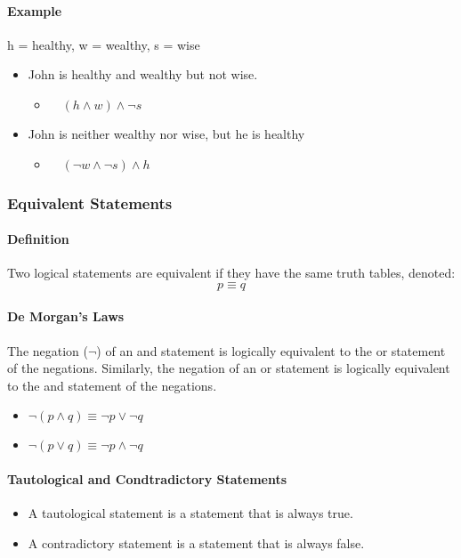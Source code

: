 \paragraph*{Example}
h = healthy, w = wealthy, s = wise\\
\begin{itemize}
    \item John is healthy and wealthy but not wise. 
    \begin{itemize}
        \item $\quad (h \land w) \land \neg s$
    \end{itemize}
    \item John is neither wealthy nor wise, but he is healthy
    \begin{itemize}
        \item $\quad (\neg w \land \neg s) \land h$
    \end{itemize} 
\end{itemize}

\subsubsection*{Equivalent Statements}
\paragraph*{Definition}
Two logical statements are equivalent if they have the same truth tables, denoted:
\begin{equation*}
    p \equiv q
\end{equation*}

\paragraph*{De Morgan's Laws}
The negation ($\neg$) of an and statement is logically equivalent to the or statement of the negations. Similarly,
the negation of an or statement is logically equivalent to the and statement of the negations. 
\begin{itemize}
    \item $\neg (p \land q) \equiv \neg p \lor \neg q$
    \item $\neg (p \lor q) \equiv \neg p \land \neg q$
\end{itemize}

\paragraph*{Tautological and Condtradictory Statements}
\begin{itemize}
    \item A tautological statement is a statement that is always true.
    \item A contradictory statement is a statement that is always false.
\end{itemize}

